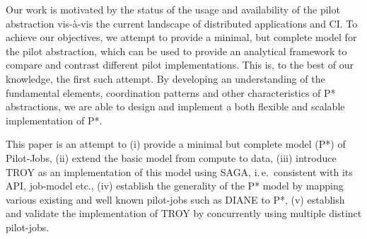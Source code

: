 \documentclass[conference,final,onecolumn]{article}
\begin{document}
Our work is motivated by the status of the usage and availability of the pilot
abstraction vis-\`{a}-vis the current landscape of distributed applications
and CI. To achieve our objectives, we attempt to provide a minimal, but
complete model for the pilot abstraction, which can be used to provide an
analytical framework to compare and contrast different pilot implementations.
This is, to the best of our knowledge, the first such attempt. By developing
an understanding of the fundamental elements, coordination patterns and other
characteristics of P* abstractions, we are able to design and implement a both
flexible and scalable implementation of P*.


This paper is an attempt to (i) provide a minimal
but complete model (P*) of Pilot-Jobs, (ii) extend the basic model from
compute to data, (iii) introduce TROY as an implementation of this model using
SAGA, i.\,e.\ consistent with its API, job-model etc., (iv) establish the
generality of the P* model by mapping various existing and well known
pilot-jobs such as DIANE to P*, (v) establish and validate the implementation
of TROY by concurrently using multiple distinct pilot-jobs.


\end{document}
